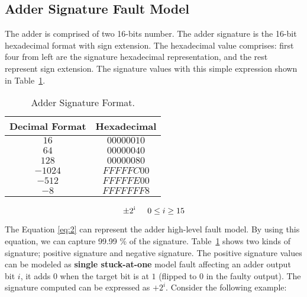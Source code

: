 \subsection{Adder Signature Fault Model}

The adder is comprised of two 16-bits number. The adder signature is the 16-bit hexadecimal format with sign extension. The hexadecimal value comprises: first four from left are the signature hexadecimal representation, and the rest represent sign extension. The signature values with this simple expression shown in Table~\ref{adder signature format}.



\begin{table}
\center
\caption{Adder Signature Format.}

\label{adder signature format}

\begin{tabular}{|c | c |} 
 \hline
Decimal Format & Hexadecimal   \\ 
\hline

 
 
 $16$& $00000010$    \\
 \hline
 $64$ & $00000040$  \\ 
 \hline
 
 $128$ & $00000080$  \\
 \hline
 $-1024$ & $FFFFFC00$ \\
 \hline
 $-512$ & $FFFFFE00$ \\
 \hline
 $-8$ & $FFFFFFF8$   \\
 \hline
 
 
\end{tabular}
\end{table}



\textit{\begin{equation}
\label{eq:2}
  \pm2\textsuperscript{i}    \hspace{0.5 cm} 0\leq i \geq15
\end{equation}}

The Equation \ref{eq:2} can represent the adder high-level fault model. By using this equation, we can capture 99.99 \% of the signature. Table~\ref{adder signature format} shows two kinds of signature; positive signature and negative signature. The positive signature values can be modeled as \textbf{single stuck-at-one} model fault affecting an adder output bit $i$,  it adds $0$ when the target bit is at $1$ (flipped to $0$ in the faulty output). The signature computed can be expressed as $+2^{i}$. Consider the following example:


